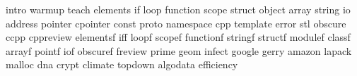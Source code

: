 intro
warmup
teach
elements
if
loop
function
scope
struct
object
array
string
io
address
pointer
cpointer
const
proto
namespace
cpp
template
error
stl
obscure
ccpp
cppreview
elementsf
iff
loopf
scopef
functionf
stringf
structf
modulef
classf
arrayf
pointf
iof
obscuref
freview
prime
geom
infect
google
gerry
amazon
lapack
malloc
dna
crypt
climate
topdown
algodata
efficiency
